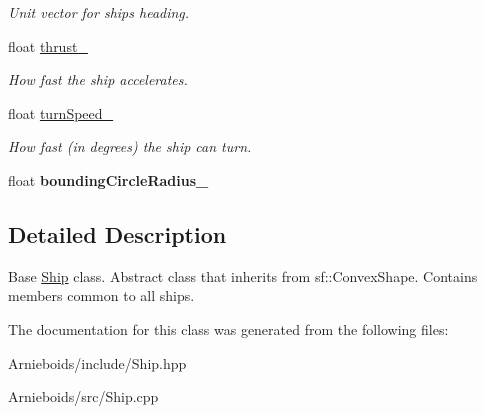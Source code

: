 \begin{DoxyCompactItemize}
\begin{DoxyCompactList}\small\item\em Unit vector for ship\textquotesingle{}s heading. \end{DoxyCompactList}\item 
\hypertarget{class_ship_a2415e485b0707df42ef22121977fdce9}{}float \hyperlink{class_ship_a2415e485b0707df42ef22121977fdce9}{thrust\+\_\+}\label{class_ship_a2415e485b0707df42ef22121977fdce9}

\begin{DoxyCompactList}\small\item\em How fast the ship accelerates. \end{DoxyCompactList}\item 
\hypertarget{class_ship_a56a38990ec7817f256bce1abe1ded6ed}{}float \hyperlink{class_ship_a56a38990ec7817f256bce1abe1ded6ed}{turn\+Speed\+\_\+}\label{class_ship_a56a38990ec7817f256bce1abe1ded6ed}

\begin{DoxyCompactList}\small\item\em How fast (in degrees) the ship can turn. \end{DoxyCompactList}\item 
\hypertarget{class_ship_a043b1bdba9024621ebb5b503545e4e16}{}float {\bfseries bounding\+Circle\+Radius\+\_\+}\label{class_ship_a043b1bdba9024621ebb5b503545e4e16}

\end{DoxyCompactItemize}


\subsection{Detailed Description}
Base \hyperlink{class_ship}{Ship} class. Abstract class that inherits from sf\+::\+Convex\+Shape. Contains members common to all ships. 

The documentation for this class was generated from the following files\+:\begin{DoxyCompactItemize}
\item 
Arnieboids/include/Ship.\+hpp\item 
Arnieboids/src/Ship.\+cpp\end{DoxyCompactItemize}
